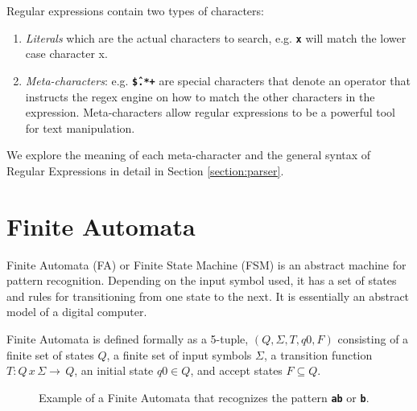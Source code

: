 Regular expressions contain two types of characters:
\begin{enumerate}
    \item \textit{Literals} which are the actual characters to search, e.g. \texttt{\textbf{x}} will match the lower case character x.
    \item \textit{Meta-characters}: e.g. \texttt{\textbf{\^\$.*+}} are special characters that denote an operator that instructs the regex engine on how to match the other characters in the expression. Meta-characters allow regular expressions to be a powerful tool for text manipulation.
\end{enumerate}

We explore the meaning of each meta-character and the general syntax of Regular Expressions in detail in Section \ref{section:parser}. 


\section{Finite Automata}

Finite Automata (FA) or Finite State Machine (FSM) is an abstract machine for pattern recognition. Depending on the input symbol used, it has a set of states and rules for transitioning from one state to the next. It is essentially an abstract model of a digital computer. 

Finite Automata is defined formally as a 5-tuple, $(Q, Σ, T, q0, F)$ consisting of a finite set of states $Q$, a finite set of input symbols $\Sigma$, a transition function $T: Q \, x \, Σ → \, Q$, an initial state $q0 ∈ Q$, and accept states $F \subseteq Q$.

\begin{figure}[H]
\centering
{}
\caption{Example of a Finite Automata that recognizes the pattern \texttt{\textbf{ab}} or \texttt{\textbf{b}}.}
\label{fig:fsm}
\end{figure}

